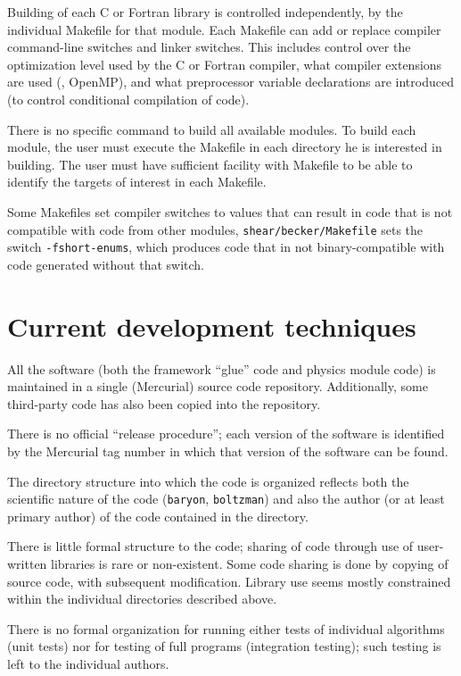 \documentclass[draftmode,draftwater]{memarticle}
\newcommand{\prog}[1]%
  {\texttt{#1}}
\newcommand{\despipe}{\name{des-pipe}\xspace}
\begin{document}
Building of each C or Fortran library is controlled independently, by
the individual Makefile for that module. Each Makefile can add or
replace compiler command-line switches and linker switches. This
includes control over the optimization level used by the C or Fortran
compiler, what compiler extensions are used (\eg, OpenMP), and what
preprocessor variable declarations are introduced (to control
conditional compilation of code).

There is no specific command to build all available modules. To build
each module, the user must execute the Makefile in each directory he is
interested in building. The user must have sufficient facility with
Makefile to be able to identify the targets of interest in each
Makefile.

Some Makefiles set compiler switches to values that can result in code
that is not compatible with code from other modules, \eg
\prog{shear/becker/Makefile} sets the switch \texttt{-fshort-enums},
which produces code that in not binary-compatible with code generated
without that switch.

\section{Current development techniques}

All the \despipe software (both the framework ``glue'' code and
physics module code) is maintained in a single (Mercurial) source code
repository. Additionally, some third-party code has also been copied
into the \despipe repository.

There is no official ``release procedure''; each version of the software
is identified by the Mercurial tag number in which that version of the
software can be found.

The directory structure into which the code is organized reflects both
the scientific nature of the code (\eg \prog{baryon}, \prog{boltzman})
and also the author (or at least primary author) of the code contained
in the directory.

There is little formal structure to the code; sharing of code through
use of user-written libraries is rare or non-existent. Some code sharing
is done by copying of source code, with subsequent modification. Library
use seems mostly constrained within the individual directories described
above.

There is no formal organization for running either tests of individual
algorithms (unit tests) nor for testing of full programs (integration
testing); such testing is left to the individual authors.
\end{document}
